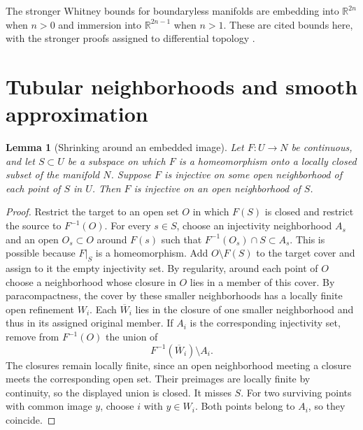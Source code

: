 \documentclass[11pt,oneside,openany]{book}
\newtheorem{lemma}[theorem]{Lemma}
\theoremstyle{definition}
\theoremstyle{remark}
\newcommand{\R}{\mathbb R}
\begin{document}
The stronger Whitney bounds for boundaryless manifolds are embedding into \(\R^{2n}\) when \(n>0\) and immersion into \(\R^{2n-1}\) when \(n>1\). These are cited bounds here, with the stronger proofs assigned to differential topology \cite[Theorems 6.19--6.20]{lee}.

\section{Tubular neighborhoods and smooth approximation}

\begin{lemma}[Shrinking around an embedded image]\label{p104:shrink-along-section}
Let \(F:U\to N\) be continuous, and let \(S\subset U\) be a subspace on which \(F\) is a homeomorphism onto a locally closed subset of the manifold \(N\). Suppose \(F\) is injective on some open neighborhood of each point of \(S\) in \(U\). Then \(F\) is injective on an open neighborhood of \(S\).
\end{lemma}
\begin{proof}
Restrict the target to an open set \(O\) in which \(F(S)\) is closed and restrict the source to \(F^{-1}(O)\). For every \(s\in S\), choose an injectivity neighborhood \(A_s\) and an open \(O_s\subset O\) around \(F(s)\) such that \(F^{-1}(O_s)\cap S\subset A_s\). This is possible because \(F|_S\) is a homeomorphism. Add \(O\setminus F(S)\) to the target cover and assign to it the empty injectivity set. By regularity, around each point of \(O\) choose a neighborhood whose closure in \(O\) lies in a member of this cover. By paracompactness, the cover by these smaller neighborhoods has a locally finite open refinement \(W_i\). Each \(\overline W_i\) lies in the closure of one smaller neighborhood and thus in its assigned original member. If \(A_i\) is the corresponding injectivity set, remove from \(F^{-1}(O)\) the union of
\[
 F^{-1}(\overline W_i)\setminus A_i .
\]
The closures remain locally finite, since an open neighborhood meeting a closure meets the corresponding open set. Their preimages are locally finite by continuity, so the displayed union is closed. It misses \(S\). For two surviving points with common image \(y\), choose \(i\) with \(y\in W_i\). Both points belong to \(A_i\), so they coincide.
\end{proof}
\end{document}
